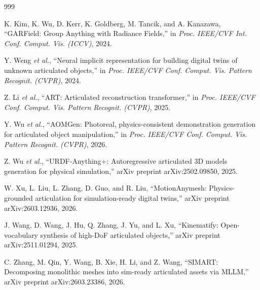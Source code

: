 \documentclass[12pt,a4paper,oneside]{report}
\begin{document}
\begin{thebibliography}{999}


K. Kim, K. Wu, D. Kerr, K. Goldberg, M. Tancik, and A. Kanazawa, ``GARField: Group Anything with Radiance Fields,'' in \textit{Proc. IEEE/CVF Int. Conf. Comput. Vis. (ICCV)}, 2024.




Y. Weng \textit{et al.}, ``Neural implicit representation for building digital twins of unknown articulated objects,'' in \textit{Proc. IEEE/CVF Conf. Comput. Vis. Pattern Recognit. (CVPR)}, 2024.




Z. Li \textit{et al.}, ``{ART}: Articulated reconstruction transformer,'' in \textit{Proc. IEEE/CVF Conf. Comput. Vis. Pattern Recognit. (CVPR)}, 2025.




Y. Wu \textit{et al.}, ``{AOMGen}: Photoreal, physics-consistent demonstration generation for articulated object manipulation,'' in \textit{Proc. IEEE/CVF Conf. Comput. Vis. Pattern Recognit. (CVPR)}, 2026.




Z. Wu \textit{et al.}, ``{URDF-Anything+}: Autoregressive articulated {3D} models generation for physical simulation,'' arXiv preprint arXiv:2502.09850, 2025.




W. Xu, L. Liu, L. Zhang, D. Guo, and R. Liu, ``{MotionAnymesh}: Physics-grounded articulation for simulation-ready digital twins,'' arXiv preprint arXiv:2603.12936, 2026.




J. Wang, D. Wang, J. Hu, Q. Zhang, J. Yu, and L. Xu, ``Kinematify: Open-vocabulary synthesis of high-{DoF} articulated objects,'' arXiv preprint arXiv:2511.01294, 2025.




C. Zhang, M. Qin, Y. Wang, B. Xie, H. Li, and Z. Wang, ``{SIMART}: Decomposing monolithic meshes into sim-ready articulated assets via {MLLM},'' arXiv preprint arXiv:2603.23386, 2026.




\end{thebibliography}
\end{document}
